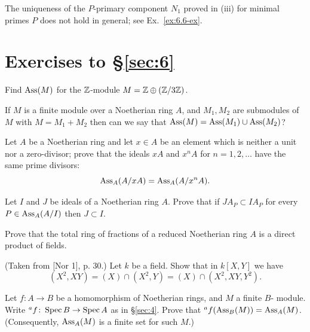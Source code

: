 \begin{remark}
The uniqueness of the $P$-primary component $N_1$ proved in (iii) for
minimal primes $P$ does not hold in general; see Ex.~\ref{ex:6.6-ex}.
\end{remark}

\section*{Exercises to \S\ref{sec:6}}

\begin{exercise}\label{ex:6.1-ex}
Find $\operatorname{Ass}(M)$ for the $\mathbb{Z}$-module $M = \mathbb{Z} \oplus (\mathbb{Z}/3\mathbb{Z})$.
\end{exercise}

\begin{exercise}\label{ex:6.2-ex}
If $M$ is a finite module over a Noetherian ring $A$, and $M_1, M_2$ are
submodules of $M$ with $M = M_1 + M_2$ then can we say that $\operatorname{Ass}(M) =
\operatorname{Ass}(M_1) \cup \operatorname{Ass}(M_2)$?
\end{exercise}

\begin{exercise}\label{ex:6.3-ex}
Let $A$ be a Noetherian ring and let $x \in A$ be an element which is neither a
unit nor a zero-divisor; prove that the ideals $xA$ and $x^nA$ for $n = 1, 2, \ldots$
have the same prime divisors:
\[
  \operatorname{Ass}_A(A/xA) = \operatorname{Ass}_A(A/x^nA).
\]
\end{exercise}

\begin{exercise}\label{ex:6.4-ex}
Let $I$ and $J$ be ideals of a Noetherian ring $A$. Prove that if $JA_P \subset IA_P$ for
every $P \in \operatorname{Ass}_A(A/I)$ then $J \subset I$.
\end{exercise}

\begin{exercise}\label{ex:6.5-ex}
Prove that the total ring of fractions of a reduced Noetherian ring $A$ is a
direct product of fields.
\end{exercise}

\begin{exercise}\label{ex:6.6-ex}
(Taken from [Nor 1], p. 30.) Let $k$ be a field. Show that in $k[X, Y]$ we have
\[
  (X^2, XY) = (X) \cap (X^2, Y) = (X) \cap (X^2, XY, Y^2).
\]
\end{exercise}

\begin{exercise}\label{ex:6.7-ex}
Let $f\colon A \to B$ be a homomorphism of Noetherian rings, and $M$ a finite $B$-
module. Write ${}^a f\colon \operatorname{Spec} B \to \operatorname{Spec} A$ as in \S\ref{sec:4}. Prove that ${}^a f(\operatorname{Ass}_B(M)) =
\operatorname{Ass}_A(M)$. (Consequently, $\operatorname{Ass}_A(M)$ is a finite set for such $M$.)
\end{exercise}
